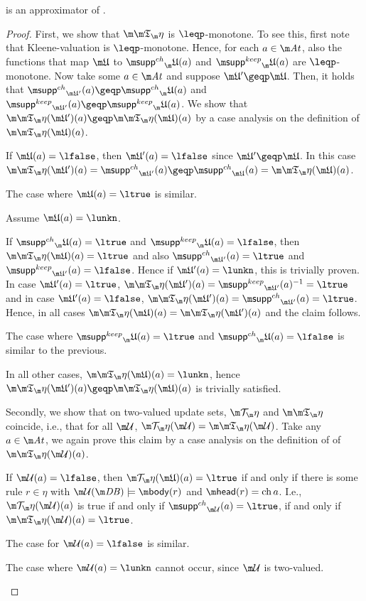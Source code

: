 \begin{proposition}
 \Ap is an approximator of \Op.
\end{proposition}
\begin{proof}
First, we show that $\Ap$ is $\leqp$-monotone. To see this, first note that Kleene-valuation is $\leqp$-monotone. Hence, for each $a\in \atoms$, also the functions that map $\UUU$ to $\suppin_\UUU(a)$ and $\suppout_\UUU(a)$ are $\leqp$-monotone. Now take some $a\in\atoms$ and suppose $\UUU'\geqp\UUU$. Then, it holds that $\suppin_{\UUU'}(a)\geqp \suppin_\UUU(a)$ and $\suppout_{\UUU'}(a)\geqp \suppout_\UUU(a)$. We show that $\Ap(\UUU')(a)\geqp \Ap(\UUU)(a)$ by a case analysis on the definition of $\Ap(\UUU)(a)$. 
\begin{compactitem}
\item If $\UUU(a)=\lfalse$, then $\UUU'(a)=\lfalse$ since $\UUU'\geqp\UUU$. In this case $\Ap(\UUU')(a) = \suppin_{\UUU'}(a) \geqp \suppin_{\UUU}(a) =  \Ap(\UUU)(a)$. 
\item The case where $\UUU(a)=\ltrue$ is similar.
\item Assume $\UUU(a) = \lunkn$. 
\begin{compactitem}
\item If $\suppin_\UUU(a) = \ltrue$ and $\suppout_\UUU(a)=\lfalse$, then $\Ap(\UUU)(a)=\ltrue$ and also $\suppin_{\UUU'}(a) = \ltrue$ and $\suppout_{\UUU'}(a)=\lfalse$. Hence if $\UUU'(a)=\lunkn$, this is trivially proven. In case $\UUU'(a)=\ltrue$, $\Ap(\UUU')(a) = \suppout_{\UUU'}(a)^{-1}=\ltrue$ and in case $\UUU'(a)=\lfalse$, $\Ap(\UUU')(a)= \suppin_{\UUU'}(a)= \ltrue$. Hence, in all cases $\Ap(\UUU)(a) = \Ap(\UUU')(a)$ and the claim follows.
\item The case where $\suppout_\UUU(a)=\ltrue$ and $\suppin_\UUU(a) = \lfalse$ is similar to the previous.
\item In all other cases, $\Ap(\UUU)(a)=\lunkn$, hence $\Ap(\UUU')(a)\geqp \Ap(\UUU)(a)$ is trivially satisfied.
\end{compactitem}

\end{compactitem}

Secondly, we show that on two-valued update sets, $\Op$ and $\Ap$ coincide, i.e., that for all $\UU$, $\Op(\UU) =  \Ap(\UU)$. Take any $a \in \atoms$, we again prove this claim by a case analysis on the definition of of $\Ap(\UU)(a)$. 
\begin{compactitem}
 \item If $\UU(a)=\lfalse$, then $\Op(\UUU)(a)= \ltrue$ if and only if there is some rule $r\in \eta$ with $\UU(\db) \models \body(r)$ and $\head(r)=\change a$. I.e., $\Op(\UU)(a)$ is true if and only if $\suppin_{\UU}(a) = \ltrue$, if and only if $\Ap(\UU)(a)=\ltrue$. 
 \item The case for $\UU(a)=\lfalse$ is similar. 
 \item The case where $\UU(a)= \lunkn$ cannot occur, since $\UU$ is two-valued. \qedhere
\end{compactitem}


\end{proof}
